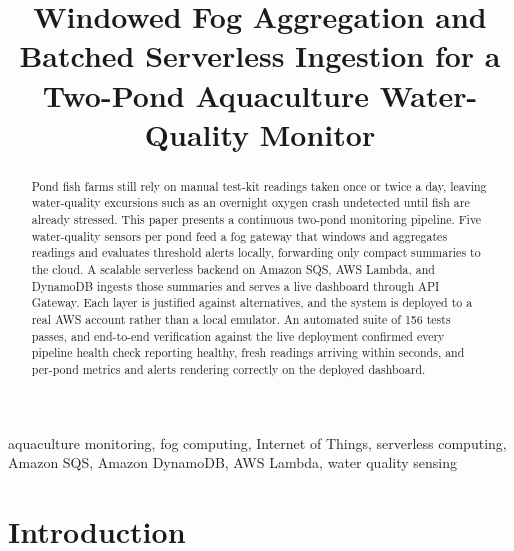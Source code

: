 \documentclass[conference]{IEEEtran}
\begin{document}
\title{Windowed Fog Aggregation and Batched Serverless Ingestion for a Two-Pond Aquaculture Water-Quality Monitor}

\author{
}

\maketitle

\begin{abstract}
Pond fish farms still rely on manual test-kit readings taken once or twice a day, leaving water-quality excursions such as an overnight oxygen crash undetected until fish are already stressed. This paper presents a continuous two-pond monitoring pipeline. Five water-quality sensors per pond feed a fog gateway that windows and aggregates readings and evaluates threshold alerts locally, forwarding only compact summaries to the cloud. A scalable serverless backend on Amazon SQS, AWS Lambda, and DynamoDB ingests those summaries and serves a live dashboard through API Gateway. Each layer is justified against alternatives, and the system is deployed to a real AWS account rather than a local emulator. An automated suite of 156 tests passes, and end-to-end verification against the live deployment confirmed every pipeline health check reporting healthy, fresh readings arriving within seconds, and per-pond metrics and alerts rendering correctly on the deployed dashboard.
\end{abstract}

\begin{IEEEkeywords}
aquaculture monitoring, fog computing, Internet of Things, serverless computing, Amazon SQS, Amazon DynamoDB, AWS Lambda, water quality sensing
\end{IEEEkeywords}

\section{Introduction}
\end{document}
